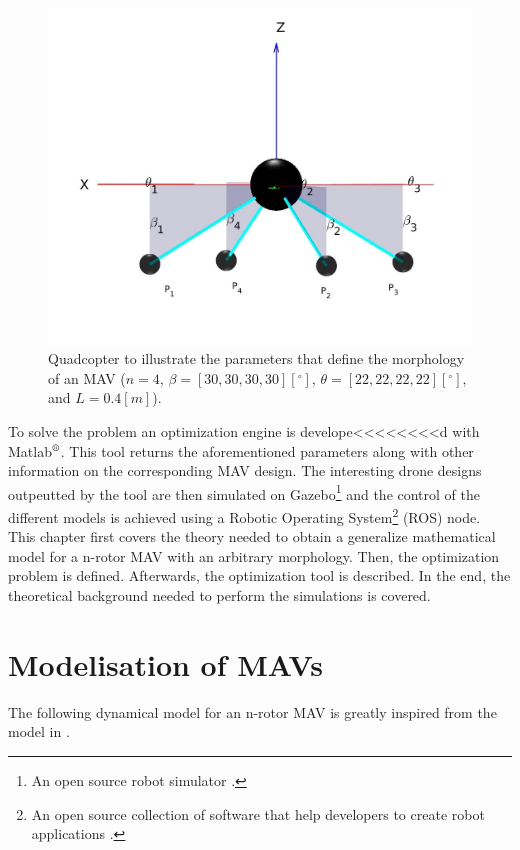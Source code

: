\begin{figure}[h]
\begin{minipage}[t]{0.3\textwidth}
  \centering
  \includegraphics[width=\textwidth]{images/drone_design2.jpg}
\end{minipage}
\caption{Quadcopter to illustrate the parameters that define the morphology of an
MAV ($n = 4$, $\beta = [30, 30, 30, 30] [^{\circ}]$, $\theta = [22, 22, 22, 22]
[^{\circ}]$, and $L = 0.4 [m]$).}
\label{fig:drone_design}
\end{figure}

To solve the problem an optimization engine is develope<<<<<<<<d with
Matlab$^\textrm{\textregistered}$. This tool returns the aforementioned
parameters along with other information on the corresponding MAV design.
The interesting drone designs outpeutted by the tool are then simulated on
Gazebo\footnote{An open source robot simulator \citep{noauthor_gazebo_nodate}.}
and the control of the different models is achieved using a Robotic Operating
System\footnote{An open source collection of software that help developers to
create robot applications \citep{rostutorials}.} (ROS) node.\\
This chapter first covers the theory needed to obtain a generalize mathematical
model for a n-rotor MAV with an arbitrary morphology. Then, the optimization
problem is defined. Afterwards, the optimization tool is described. In the end,
the theoretical background needed to perform the simulations is covered.

\section{Modelisation of MAVs}
\label{sec:modeling_mav}
The following dynamical model for an n-rotor MAV is greatly inspired from the
model in \citep{ryll_modeling_2012}.
